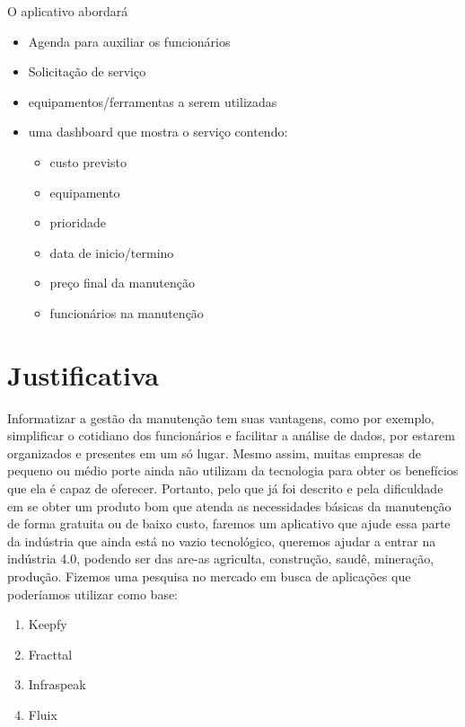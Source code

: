\documentclass[%
  a4paper,%
  12pt,%
  english,%
  brazilian,%
]{article}
\begin{document}
O aplicativo abordará 
\begin{itemize}
    \item Agenda para auxiliar os funcionários
    \item Solicitação de serviço
    \item equipamentos/ferramentas a serem utilizadas
    \item uma dashboard que mostra o serviço contendo:
    \begin{itemize}
    \item custo previsto
    \item equipamento
    \item prioridade 
    \item data de inicio/termino
    \item preço final da manutenção
    \item funcionários na manutenção
    \end{itemize}    
\end{itemize}
    

\section{Justificativa}%
Informatizar a gestão da manutenção tem suas vantagens, como por exemplo, simplificar o cotidiano dos funcionários e facilitar a análise de dados, por estarem organizados e presentes em um só lugar. Mesmo assim, muitas empresas de pequeno ou médio porte ainda não utilizam da tecnologia para obter os benefícios que ela é capaz de oferecer. Portanto, pelo que já foi descrito e pela dificuldade em se obter um produto bom que atenda as necessidades básicas da manutenção de forma gratuita ou de baixo custo, faremos um aplicativo que ajude essa parte da indústria que ainda está no vazio tecnológico, queremos ajudar a entrar na indústria 4.0, podendo ser das are-as agriculta, construção, saudê, mineração, produção.
Fizemos uma pesquisa no mercado em busca de aplicações que poderíamos utilizar como base:
\begin{enumerate}
    \item Keepfy
    \item Fracttal
    \item Infraspeak
    \item Fluix
\end{enumerate}

\end{document}
